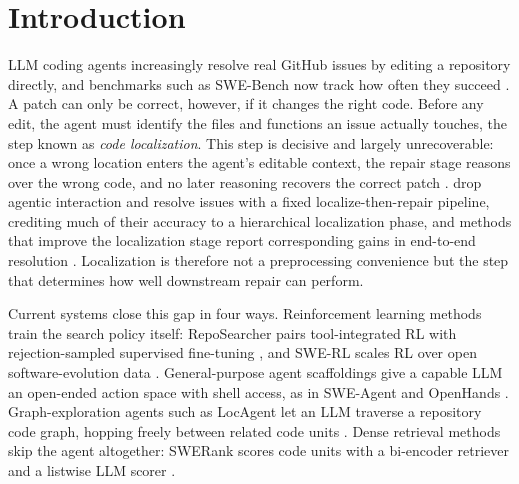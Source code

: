 \section{Introduction}
\label{sec:intro}

LLM coding agents increasingly resolve real GitHub issues by
editing a repository directly, and benchmarks such as SWE-Bench
now track how often they succeed \citep{jimenez2024swebench}. A
patch can only be correct, however, if it changes the right
code. Before any edit, the agent must identify the files and
functions an issue actually touches, the step known as
\emph{code localization}. This step is decisive and largely
unrecoverable: once a wrong location enters the agent's editable
context, the repair stage reasons over the wrong code, and no
later reasoning recovers the correct patch
\citep{jimenez2024swebench, yang2024sweagent}. \citet{xia2024agentless}
drop agentic interaction and resolve issues with a fixed
localize-then-repair pipeline, crediting much of their accuracy
to a hierarchical localization phase, and methods that improve
the localization stage report corresponding gains in end-to-end
resolution \citep{sohrabizadeh2025nemotroncortexa}. Localization
is therefore not a preprocessing convenience but the step that
determines how well downstream repair can perform.

Current systems close this gap in four ways. Reinforcement learning methods
train the search policy itself: RepoSearcher pairs
tool-integrated RL with rejection-sampled supervised
fine-tuning \citep{ma2025tooltrain}, and SWE-RL scales RL over
open software-evolution data \citep{wei2025swerl}.
General-purpose agent scaffoldings give a capable LLM an
open-ended action space with shell access, as in SWE-Agent and
OpenHands \citep{yang2024sweagent, wang2025openhands}.
Graph-exploration agents such as LocAgent let an LLM traverse a
repository code graph, hopping freely between related code units
\citep{chen2025locagent}. Dense retrieval methods skip the agent
altogether: SWERank scores code units with a bi-encoder
retriever and a listwise LLM scorer
\citep{reddy2025sweranksoftwareissuelocalization}.

